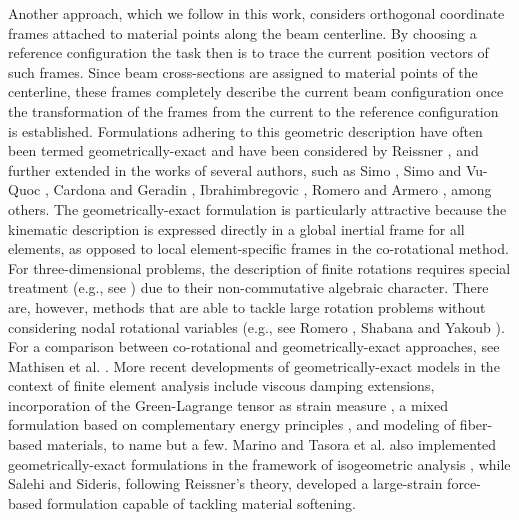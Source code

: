 Another approach, which we follow in this work, considers orthogonal coordinate
frames attached to material points along the beam centerline. By choosing
a reference configuration the task then is to trace the current position vectors
of such frames. Since beam cross-sections are assigned to material points of the
centerline, these frames completely describe the current beam configuration 
once the transformation of the frames from the current to the reference
configuration is established. Formulations adhering to this geometric description
have often been termed geometrically-exact and have been considered by
Reissner \cite{Reissner1}, and further
extended in the works of several authors, such as Simo \cite{Simo1}, Simo and
Vu-Quoc \cite{Simo2,Simo3}, Cardona and Geradin \cite{Cardona1}, Ibrahimbregovic 
\cite{Ibrahim1},  Romero and Armero \cite{RomArm}, among others.
The geometrically-exact formulation is particularly attractive because the
kinematic description is expressed directly in a global inertial frame for all
elements, as opposed to local element-specific frames in the co-rotational method. For 
three-dimensional problems, the description of finite rotations requires
special treatment (e.g., see \cite{Argyris:1982,Romero:2004}) due to their
non-commutative algebraic character. There are, however, methods that
are able to tackle large rotation problems without considering nodal rotational
variables (e.g., see Romero \cite{Romero:2008}, Shabana and Yakoub 
\cite{Shabana}).
For a comparison between co-rotational and geometrically-exact approaches,
see Mathisen et al. \cite{Mathisen}.
More recent developments of geometrically-exact models in the context of
finite element analysis include viscous damping extensions\cite{Oliveto},
incorporation of the Green-Lagrange tensor as strain measure \cite{Panteli},
a mixed formulation based on complementary energy principles \cite{Santos},
and modeling of fiber-based
materials\cite{Meier}, to name but a few. Marino \cite{Marino} and
Tasora et al. \cite{Tasora} also implemented geometrically-exact formulations
in the framework of isogeometric analysis \cite{HughesBaz}, while
Salehi and Sideris\cite{Salehi}, following Reissner's theory, developed a
large-strain force-based formulation capable of tackling material softening.

